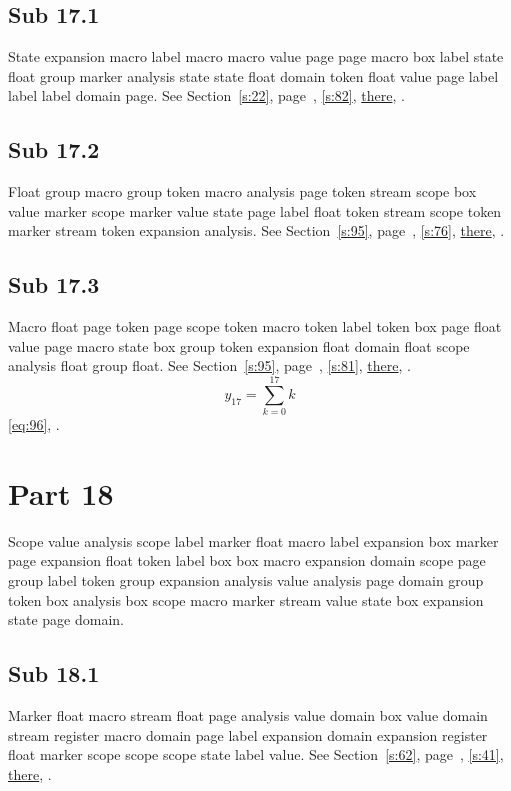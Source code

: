 \documentclass[11pt]{article}
\begin{document}
\subsection{Sub 17.1}\label{ss:17.1} State expansion macro label macro macro value page page macro box label state float group marker analysis state state float domain token float value page label label label domain page. See Section~\ref{s:22}, page~\pageref{ss:82.1}, \cref{s:82}, \hyperref[s:7]{there}, \cite{k19,k15}.
\subsection{Sub 17.2}\label{ss:17.2} Float group macro group token macro analysis page token stream scope box value marker scope marker value state page label float token stream scope token marker stream token expansion analysis. See Section~\ref{s:95}, page~\pageref{ss:98.3}, \cref{s:76}, \hyperref[s:40]{there}, \cite{k56,k36}.
\subsection{Sub 17.3}\label{ss:17.3} Macro float page token page scope token macro token label token box page float value page macro state box group token expansion float domain float scope analysis float group float. See Section~\ref{s:95}, page~\pageref{ss:84.3}, \cref{s:81}, \hyperref[s:14]{there}, \cite{k89,k3}.
\begin{equation}y_{17}=\sum_{k=0}^{17}k\label{eq:17}\end{equation} \eqref{eq:96}, .
\section{Part 18}\label{s:18}
Scope value analysis scope label marker float macro label expansion box marker page expansion float token label box box macro expansion domain scope page group label token group expansion analysis value analysis page domain group token box analysis box scope macro marker stream value state box expansion state page domain.
\subsection{Sub 18.1}\label{ss:18.1} Marker float macro stream float page analysis value domain box value domain stream register macro domain page label expansion domain expansion register float marker scope scope scope state label value. See Section~\ref{s:62}, page~\pageref{ss:64.1}, \cref{s:41}, \hyperref[s:2]{there}, \cite{k30,k50}.
\end{document}
